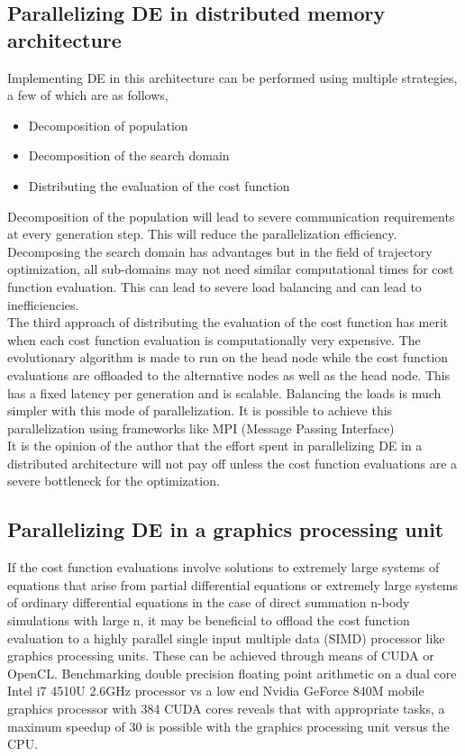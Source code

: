 \subsection{Parallelizing DE in distributed memory architecture}
Implementing DE in this architecture can be performed using multiple strategies, a few of which are as follows,
\begin{itemize}
	\item Decomposition of population
	\item Decomposition of the search domain
	\item Distributing the evaluation of the cost function
\end{itemize}

Decomposition of the population will lead to severe communication requirements at every generation step. This will reduce the parallelization efficiency. Decomposing the search domain has advantages but in the field of trajectory optimization, all sub-domains may not need similar computational times for cost function evaluation. This can lead to severe load balancing and can lead to inefficiencies.\\
The third approach of distributing the evaluation of the cost function has merit when each cost function evaluation is computationally very expensive. The evolutionary algorithm is made to run on the head node while the cost function evaluations are offloaded to the alternative nodes as well as the head node. This has a fixed latency per generation and is scalable. Balancing the loads is much simpler with this mode of parallelization. It is possible to achieve this parallelization using frameworks like MPI (Message Passing Interface)\\
It is the opinion of the author that the effort spent in parallelizing DE in a distributed architecture will not pay off unless the cost function evaluations are a severe bottleneck for the optimization. 

\subsection{Parallelizing DE in a graphics processing unit}
If the cost function evaluations involve solutions to extremely large systems of equations that arise from partial differential equations or extremely large systems of ordinary differential equations in the case of direct summation n-body simulations with large n, it may be beneficial to offload the cost function evaluation to a highly parallel single input multiple data (SIMD) processor like graphics processing units. These can be achieved through means of CUDA or OpenCL. Benchmarking double precision floating point arithmetic on a dual core Intel i7 4510U 2.6GHz processor vs a low end Nvidia GeForce 840M mobile graphics processor with 384 CUDA cores reveals that with appropriate tasks, a maximum speedup of 30 is possible with the graphics processing unit versus the CPU.

